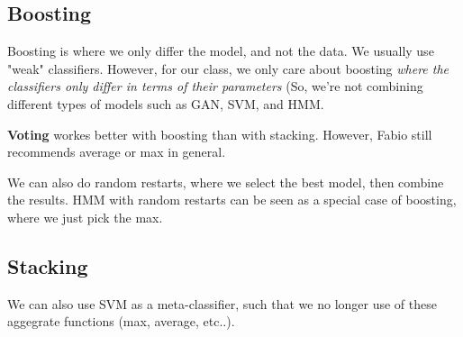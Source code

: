 \documentclass[12pt]{article}
\begin{document}
\subsection{Boosting}
Boosting is where we only differ the model, and not the data. We usually use "weak" classifiers. However, for our class, we only care about boosting \textit{where the classifiers only differ in terms of their parameters} (So, we're not combining different types of models such as GAN, SVM, and HMM.

\textbf{Voting} workes better with boosting than with stacking. However, Fabio still recommends average or max in general. 

We can also do random restarts, where we select the best model, then combine the  results. HMM with random restarts can be seen as a special case of boosting, where we just pick the max.
\subsection{Stacking}

We can also use SVM as a meta-classifier, such that we no longer use of these aggegrate functions (max, average, etc..).
\end{document}
